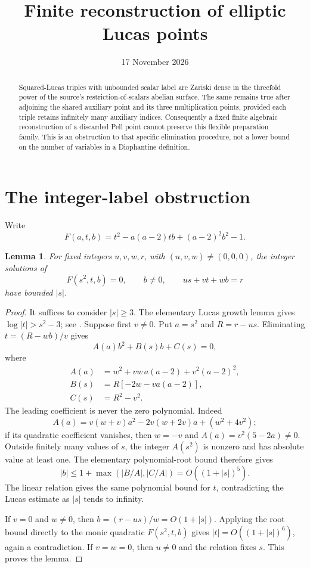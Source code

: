 \documentclass[11pt,a4paper]{article}
\title{Finite reconstruction of elliptic Lucas points}
\author{}\date{17 November 2026}
\newtheorem{lemma}[theorem]{Lemma}
\begin{document}
\maketitle
\begin{abstract}
Squared-Lucas triples with unbounded scalar label are Zariski dense
in the threefold power of the source's restriction-of-scalars abelian
surface. The same remains true after adjoining the shared auxiliary
point and its three multiplication points, provided each triple retains
infinitely many auxiliary indices. Consequently a fixed finite
algebraic reconstruction of a discarded Pell point cannot preserve
this flexible preparation family. This is an obstruction to that
specific elimination procedure, not a lower bound on the number of
variables in a Diophantine definition.
\end{abstract}

\section{The integer-label obstruction}
Write
\[
 F(a,t,b)=t^2-a(a-2)tb+(a-2)^2b^2-1.
\]

\begin{lemma}\label{lem:affine}
For fixed integers $u,v,w,r$, with $(u,v,w)\ne(0,0,0)$,
the integer solutions of
\[
 F(s^2,t,b)=0,\qquad b\ne0,\qquad us+vt+wb=r
\]
have bounded $|s|$.
\end{lemma}
\begin{proof}
It suffices to consider $|s|\ge3$. The elementary Lucas growth lemma
gives $\log|t|>s^2-3$; see \cite{Lucas}. Suppose first $v\ne0$.
Put $a=s^2$ and $R=r-us$. Eliminating $t=(R-wb)/v$ gives
\[
 A(a)b^2+B(s)b+C(s)=0,
\]
where
\begin{align*}
 A(a)&=w^2+vw\,a(a-2)+v^2(a-2)^2,\\
 B(s)&=R[-2w-va(a-2)],\\
 C(s)&=R^2-v^2.
\end{align*}
The leading coefficient is never the zero polynomial. Indeed
\[
 A(a)=v(w+v)a^2-2v(w+2v)a+(w^2+4v^2);
\]
if its quadratic coefficient vanishes, then $w=-v$ and
$A(a)=v^2(5-2a)\ne0$. Outside finitely many values of $s$,
the integer $A(s^2)$ is nonzero and has absolute value at least one.
The elementary polynomial-root bound therefore gives
\[
 |b|\le 1+\max(|B/A|,|C/A|)=O((1+|s|)^5).
\]
The linear relation gives the same polynomial bound for $t$,
contradicting the Lucas estimate as $|s|$ tends to infinity.

If $v=0$ and $w\ne0$, then $b=(r-us)/w=O(1+|s|)$.
Applying the root bound directly to the monic quadratic $F(s^2,t,b)$
gives $|t|=O((1+|s|)^6)$, again a contradiction. If $v=w=0$,
then $u\ne0$ and the relation fixes $s$. This proves the lemma.
\end{proof}
\end{document}
